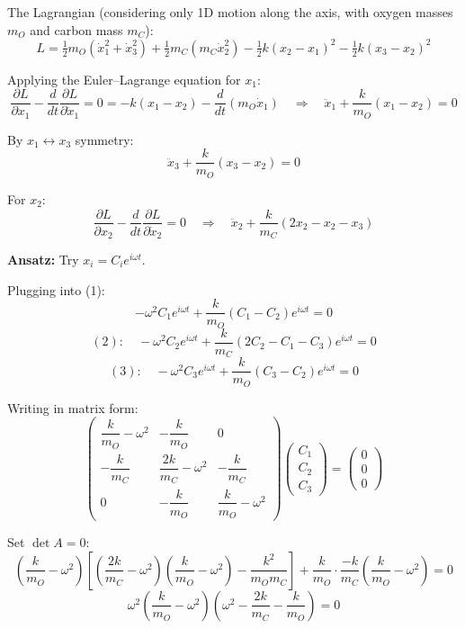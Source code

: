 The Lagrangian (considering only 1D motion along the axis, with oxygen masses $m_O$ and carbon mass $m_C$):
\[
    L = \tfrac{1}{2}m_O(\dot{x}_1^2 + \dot{x}_3^2) + \tfrac{1}{2}m_C(m_C \dot{x}_2^2)
        - \tfrac{1}{2}k(x_2 - x_1)^2 - \tfrac{1}{2}k(x_3 - x_2)^2
\]

Applying the Euler--Lagrange equation for $x_1$:
\[
    \frac{\partial L}{\partial x_1} - \frac{d}{dt}\frac{\partial L}{\partial \dot{x}_1} = 0
    = -k(x_1 - x_2) - \frac{d}{dt}(m_O \dot{x}_1)
    \quad\Rightarrow\quad
    \ddot{x}_1 + \frac{k}{m_O}(x_1 - x_2) = 0 \tag{1}
\]

By $x_1 \leftrightarrow x_3$ symmetry:
\[
    \ddot{x}_3 + \frac{k}{m_O}(x_3 - x_2) = 0 \tag{3}
\]

For $x_2$:
\[
    \frac{\partial L}{\partial x_2} - \frac{d}{dt}\frac{\partial L}{\partial \dot{x}_2} = 0
    \quad\Rightarrow\quad
    \ddot{x}_2 + \frac{k}{m_C}(2x_2 - x_2 - x_3) \tag{2}
\]

\textbf{Ansatz:} Try $x_i = C_i e^{i\omega t}$.

Plugging into (1):
\[
    -\omega^2 C_1 e^{i\omega t} + \frac{k}{m_O}(C_1 - C_2)e^{i\omega t} = 0
\]
\[
    (2): \quad -\omega^2 C_2 e^{i\omega t} + \frac{k}{m_C}(2C_2 - C_1 - C_3)e^{i\omega t} = 0
\]
\[
    (3): \quad -\omega^2 C_3 e^{i\omega t} + \frac{k}{m_O}(C_3 - C_2)e^{i\omega t} = 0
\]

Writing in matrix form:
\[
    \begin{pmatrix}
        \dfrac{k}{m_O} - \omega^2 & -\dfrac{k}{m_O} & 0 \\[8pt]
        -\dfrac{k}{m_C} & \dfrac{2k}{m_C} - \omega^2 & -\dfrac{k}{m_C} \\[8pt]
        0 & -\dfrac{k}{m_O} & \dfrac{k}{m_O} - \omega^2
    \end{pmatrix}
    \begin{pmatrix} C_1 \\ C_2 \\ C_3 \end{pmatrix}
    =
    \begin{pmatrix} 0 \\ 0 \\ 0 \end{pmatrix}
\]

Set $\det A = 0$:
\[
    \left(\frac{k}{m_O} - \omega^2\right)
    \left[\left(\frac{2k}{m_C} - \omega^2\right)\left(\frac{k}{m_O} - \omega^2\right)
    - \frac{k^2}{m_O m_C}\right]
    + \frac{k}{m_O}\cdot\frac{-k}{m_C}\left(\frac{k}{m_O} - \omega^2\right) = 0
\]
\[
    \omega^2\left(\frac{k}{m_O} - \omega^2\right)\left(\omega^2 - \frac{2k}{m_C} - \frac{k}{m_O}\right) = 0
\]


